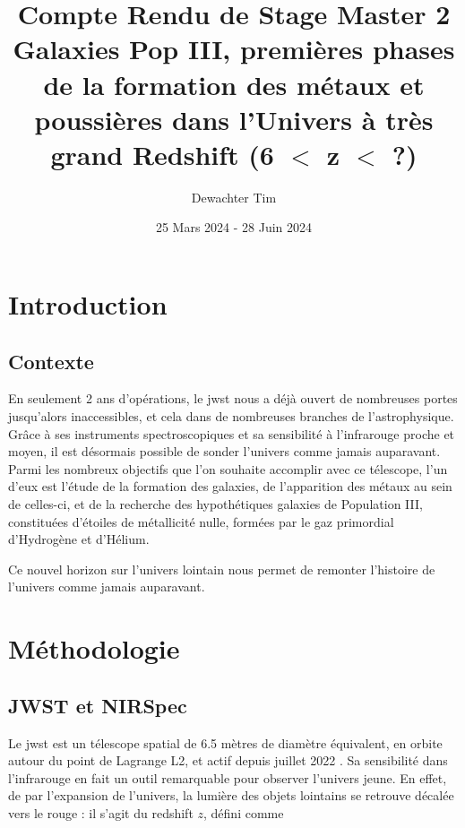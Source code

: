 \documentclass[11pt, a4paper, twocolumn]{article}
\title{\Huge Compte Rendu de Stage Master 2\\
\large Galaxies Pop III, premières phases de la formation des métaux et poussières dans l'Univers à très grand Redshift (6 $<$ z $<$ ?)}
\author{Dewachter Tim}
\date{25 Mars 2024 - 28 Juin 2024}
\begin{document}
\maketitle

\newpage

\tableofcontents

\newpage

\section{Introduction}

\subsection{Contexte}

En seulement 2 ans d'opérations, le \gls{jwst} nous a déjà ouvert de nombreuses portes jusqu'alors inaccessibles, et cela dans de nombreuses branches de l'astrophysique. Grâce à ses instruments spectroscopiques et sa sensibilité à l'infrarouge proche et moyen, il est désormais possible de sonder l'univers comme jamais auparavant. Parmi les nombreux objectifs que l'on souhaite accomplir avec ce télescope, l'un d'eux est l'étude de la formation des galaxies, de l'apparition des métaux au sein de celles-ci, et de la recherche des hypothétiques galaxies de Population III, constituées d'étoiles de métallicité nulle, formées par le gaz primordial d'Hydrogène et d'Hélium.

Ce nouvel horizon sur l'univers lointain nous permet de remonter l'histoire de l'univers comme jamais auparavant. \cite{2023arXiv230600953M}



\section{Méthodologie}

\subsection{JWST et NIRSpec}

Le \gls{jwst} est un télescope spatial de 6.5 mètres de diamètre équivalent, en orbite autour du point de Lagrange L2, et actif depuis juillet 2022 \cite{jwst_website}. Sa sensibilité dans l'infrarouge en fait un outil remarquable pour observer l'univers jeune. En effet, de par l'expansion de l'univers, la lumière des objets lointains se retrouve décalée vers le rouge : il s'agit du redshift $z$, défini comme 
\end{document}
